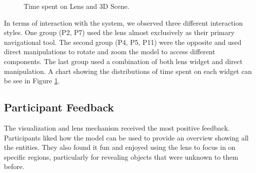  
\begin{figure}
\caption{Time spent on Lens and 3D Scene.}
\label{chart:usage}     
\end{figure}
  
   
In terms of interaction with the system, we observed three different
interaction styles. One group (P2, P7) used the lens almost exclusively
as their primary navigational tool. The second group (P4, P5, P11) were the
opposite and used direct manipulations to rotate and zoom the \threed model to
access different components. The last group used a combination of both lens
widget and direct manipulation. A chart showing the distributions of time spent
on each widget can be see in Figure \ref{chart:usage}.



\subsection{Participant Feedback}
The \threed visualization and lens mechanism received the most positive
feedback. Participants liked how the \threed model can be used to provide 
an overview showing all the entities. They also found it fun and enjoyed using
the lens to focus in on specific regions, particularly for revealing objects
that were unknown to them before.

